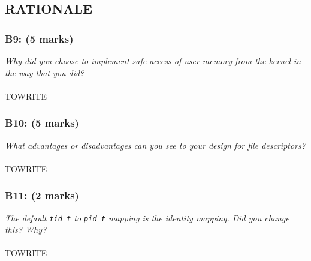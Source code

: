 \documentclass{article}
\begin{document}
\subsection{RATIONALE}

\subsubsection*{B9: (5 marks) }
\textit{Why did you choose to implement safe access of user memory from the
kernel in the way that you did?}
\\ \\ TOWRITE

\subsubsection*{B10: (5 marks) }
\textit{What advantages or disadvantages can you see to your design for file
descriptors?}
\\ \\ TOWRITE

\subsubsection*{B11: (2 marks) }
\textit{The default \texttt{tid\_t} to \texttt{pid\_t} mapping is the identity mapping. Did you
change this? Why?}
\\ \\ TOWRITE
\end{document}
